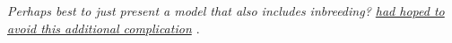\documentclass{article}
\newcommand\hl[1]{%
  \bgroup
  \hskip0pt\color{blue!80!black}%
  #1%
  \egroup
}
\begin{document}
{\itshape \hl{Perhaps best to just present a model that also includes inbreeding? \underline{had hoped to avoid this additional complication}}}.




\end{document}
